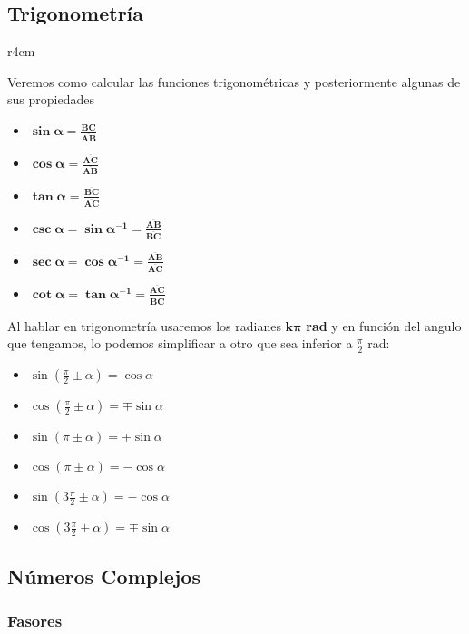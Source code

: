 \subsection{Trigonometría}
\begin{wrapfigure}{r}{4cm}
        \vspace{1cm}
        \hspace{-4cm}
\end{wrapfigure}
\noindent Veremos como calcular las funciones trigonométricas y posteriormente algunas de sus propiedades
\begin{itemize}
        \item \(\bm{\sin{\bm{\alpha}} = \frac{\overline{BC}}{\overline{AB}}}\)
        \item \(\bm{\cos{\bm{\alpha}} = \frac{\overline{AC}}{\overline{AB}}}\)
        \item \(\bm{\tan{\bm{\alpha}} = \frac{\overline{BC}}{\overline{AC}}}\)
        \item \(\bm{\csc{\bm{\alpha}} = \sin{\bm{\alpha}}^{-1}=\frac{\overline{AB}}{\overline{BC}}}\)
        \item \(\bm{\sec{\bm{\alpha}} = \cos{\bm{\alpha}}^{-1}=\frac{\overline{AB}}{\overline{AC}}}\)
        \item \(\bm{\cot{\bm{\alpha}} = \tan{\bm{\alpha}}^{-1}=\frac{\overline{AC}}{\overline{BC}}}\)
\end{itemize}
Al hablar en trigonometría usaremos los radianes \(\bm{k\pi}\) \textbf{rad} y en función del angulo que tengamos, lo podemos simplificar a otro que sea inferior a \(\frac{\pi}{2}\) rad:
\begin{itemize}
        \item {\boldmath \(\sin{(\frac{\pi}{2} \pm \alpha)} = \cos{\alpha}\)}
        \item {\boldmath \(\cos{(\frac{\pi}{2} \pm \alpha)} = \mp\sin{\alpha}\)}
        \item {\boldmath \(\sin{(\pi \pm \alpha)} = \mp\sin{\alpha}\)}
        \item {\boldmath \(\cos{(\pi \pm \alpha)} = -\cos{\alpha}\)}
        \item {\boldmath \(\sin{(3\frac{\pi}{2} \pm \alpha)} = -\cos{\alpha}\)}
        \item {\boldmath \(\cos{(3\frac{\pi}{2} \pm \alpha)} = \mp\sin{\alpha}\)}
\end{itemize}
\subsection{Números Complejos}
\subsubsection{Fasores}
